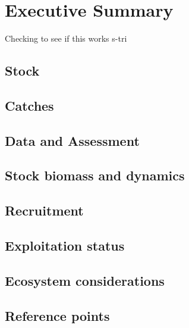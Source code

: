 \documentclass[
]{scrartcl}
\begin{document}
\newpage{}

\section*{Executive Summary}\label{executive-summary}

Checking to see if this works \gls{s-tri}

\subsection*{Stock}\label{stock}

\subsection*{Catches}\label{catches}

\subsection*{Data and Assessment}\label{data-and-assessment}

\subsection*{Stock biomass and
dynamics}\label{stock-biomass-and-dynamics}

\subsection*{Recruitment}\label{recruitment}

\subsection*{Exploitation status}\label{exploitation-status}

\subsection*{Ecosystem considerations}\label{ecosystem-considerations}

\subsection*{Reference points}\label{reference-points}
\end{document}
